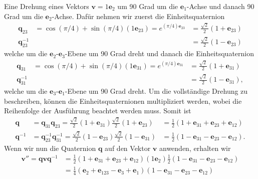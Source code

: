 \begin{beispiel}
	Eine Drehung eines Vektors $\mathbf{v}= 1\mathbf{e}_2$ um 90 Grad um die $\mathbf{e}_1$-Achse und danach 90 Grad um die $\mathbf{e}_2$-Achse. Dafür nehmen wir zuerst die Einheitsquaternion 
	\begin{align}
	\mathbf{q}_{23} &= \cos(\pi/4) + \sin(\pi/4)(1\mathbf{e}_{23}) =  e^{(\pi/4)\mathbf{e}_{23}} &= \textstyle{\frac{\sqrt{2}}{2}}(1 + \mathbf{e}_{23})\\
	\mathbf{q}_{23}^{-1} &&= \textstyle{\frac{\sqrt{2}}{2}} (1- \mathbf{e}_{23})
	\end{align}
	welche um die $\mathbf{e}_{2}$-$\mathbf{e}_{3}$-Ebene um 90 Grad dreht und danach die Einheitsquaternion 
	\begin{align}
	\mathbf{q}_{31} &= \cos(\pi/4) + \sin(\pi/4)(1\mathbf{e}_{31}) =  e^{(\pi/4)\mathbf{e}_{31}} &= \textstyle{\frac{\sqrt{2}}{2}}(1 + \mathbf{e}_{31})\\
	\mathbf{q}_{31}^{-1} &&= \textstyle{\frac{\sqrt{2}}{2}}(1 - \mathbf{e}_{31}),
	\end{align}
	welche um die $\mathbf{e}_{3}$-$\mathbf{e}_{1}$-Ebene  um 90 Grad dreht. Um die vollständige Drehung zu beschreiben, können die Einheitsquaternionen multipliziert werden, wobei die Reihenfolge der Ausführung beachtet werden muss. Somit ist
	\begin{align} \label{FormelBeispielQuaternion}
	\mathbf{q} &= \mathbf{q}_{31}\mathbf{q}_{23} = \textstyle{\frac{\sqrt{2}}{2}}(1 + \mathbf{e}_{31})\textstyle{\frac{\sqrt{2}}{2}}(1 + \mathbf{e}_{23}) &= \textstyle{\frac{1}{2}}(1 + \mathbf{e}_{31} + \mathbf{e}_{23} + \mathbf{e}_{12})\\
	\mathbf{q}^{-1} &= \mathbf{q}_{23}^{-1}\mathbf{q}_{31}^{-1} = \textstyle{\frac{\sqrt{2}}{2}} (1- \mathbf{e}_{23})\textstyle{\frac{\sqrt{2}}{2}}(1 -\mathbf{e}_{31}) &= \textstyle{\frac{1}{2}}(1 - \mathbf{e}_{31} - \mathbf{e}_{23} - \mathbf{e}_{12}).
	\end{align}
	Wenn wir nun die Quaternion $\mathbf{q}$ auf den Vektor $\mathbf{v}$ anwenden, erhalten wir
	\begin{align}
	\mathbf{v}'' = \mathbf{qvq}^{-1} &= \textstyle{\frac{1}{2}}(1 + \mathbf{e}_{31} +  \mathbf{e}_{23} +  \mathbf{e}_{12})(1\mathbf{e}_2)\textstyle{\frac{1}{2}}(1 - \mathbf{e}_{31} -  \mathbf{e}_{23} -  \mathbf{e}_{12})\\ 
	&= \textstyle{\frac{1}{4}}(\mathbf{e}_2 +  \mathbf{e}_{123} -  \mathbf{e}_3 +  \mathbf{e}_1)(1 - \mathbf{e}_{31} -  \mathbf{e}_{23} -  \mathbf{e}_{12})\\

\end{align}
\end{beispiel}
